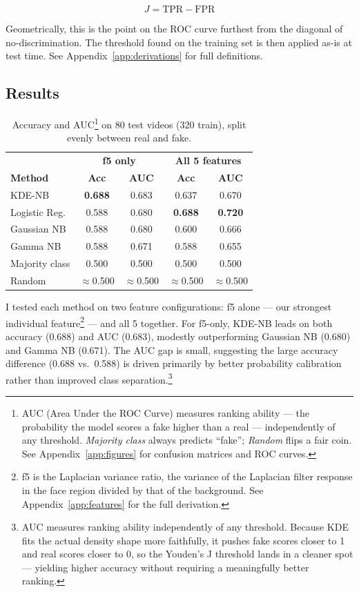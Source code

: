 \documentclass{article}
\begin{document}
\begin{equation}
J = \text{TPR} - \text{FPR}
\end{equation}

Geometrically, this is the point on the ROC curve furthest from the diagonal of no-discrimination. The threshold found on the training set is then applied as-is at test time. See Appendix~\ref{app:derivations} for full definitions.

\subsection*{Results}

  \begin{table}[h]
  \centering
  \begin{tabular}{lcccc}
  \hline
  & \multicolumn{2}{c}{\textbf{f5 only}} & \multicolumn{2}{c}{\textbf{All 5 features}} \\
  \textbf{Method} & \textbf{Acc} & \textbf{AUC} & \textbf{Acc} & \textbf{AUC} \\
  \hline
  KDE-NB        & \textbf{0.688} & 0.683 & 0.637 & 0.670 \\
  Logistic Reg. & 0.588 & 0.680 & \textbf{0.688} & \textbf{0.720} \\
  Gaussian NB   & 0.588 & 0.680 & 0.600 & 0.666 \\
  Gamma NB      & 0.588 & 0.671 & 0.588 & 0.655 \\
  \hline
  Majority class & 0.500 & 0.500 & 0.500 & 0.500 \\
  Random         & $\approx$0.500 & $\approx$0.500 & $\approx$0.500 & $\approx$0.500 \\
  \hline
  \end{tabular}
  \caption{Accuracy and AUC\protect\footnote{AUC (Area Under the ROC Curve) measures ranking ability --- the probability the model scores a fake higher than a real --- independently of any threshold. \textit{Majority class} always predicts ``fake''; \textit{Random} flips a fair coin. See Appendix~\ref{app:figures} for confusion matrices and ROC curves.} on 80 test videos (320 train), split evenly between real and fake.}
  \label{tab:results}
  \end{table}

I tested each method on two feature configurations: f5 alone --- our strongest individual feature\footnote{f5 is the Laplacian variance ratio, the variance of the Laplacian filter response in the face region divided by that of the background. See Appendix~\ref{app:features} for the full derivation.} --- and all 5 together. For f5-only, KDE-NB leads on both accuracy (0.688) and AUC (0.683), modestly outperforming Gaussian NB (0.680) and Gamma NB (0.671). The AUC gap is small, suggesting the large accuracy difference (0.688 vs.\ 0.588) is driven primarily by better probability calibration rather than improved class separation.\footnote{AUC measures ranking ability independently of any threshold. Because KDE fits the actual density shape more faithfully, it pushes fake scores closer to 1 and real scores closer to 0, so the Youden's J threshold lands in a cleaner spot --- yielding higher accuracy without requiring a meaningfully better ranking.}
\end{document}

